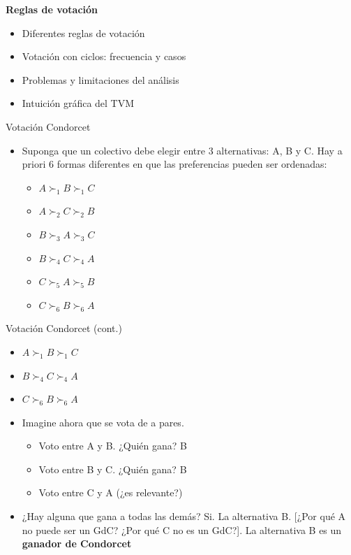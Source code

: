 \documentclass[
  ignorenonframetext,
]{beamer}
\providecommand{\tightlist}{%
  \setlength{\itemsep}{0pt}\setlength{\parskip}{0pt}}\usepackage{longtable,booktabs,array}
\begin{document}
\begin{frame}{\textbf{Reglas de votación}}
\protect\hypertarget{reglas-de-votaciuxf3n}{}
\begin{itemize}
\tightlist
\item
  Diferentes reglas de votación
\item
  Votación con ciclos: frecuencia y casos
\item
  Problemas y limitaciones del análisis
\item
  Intuición gráfica del TVM
\end{itemize}

\begin{block}{Votación Condorcet}
\protect\hypertarget{votaciuxf3n-condorcet}{}
\begin{itemize}
\tightlist
\item
  Suponga que un colectivo debe elegir entre 3 alternativas: A, B y C.
  Hay a priori 6 formas diferentes en que las preferencias pueden ser
  ordenadas:

  \begin{itemize}
  \tightlist
  \item
    \(A \succ_{1} B \succ_{1} C\)
  \item
    \(A \succ_{2} C \succ_{2} B\)
  \item
    \(B \succ_{3} A \succ_{3} C\)
  \item
    \(B \succ_{4} C \succ_{4} A\)
  \item
    \(C \succ_{5} A \succ_{5} B\)
  \item
    \(C \succ_{6} B \succ_{6} A\)
  \end{itemize}
\end{itemize}
\end{block}

\begin{block}{Votación Condorcet (cont.)}
\protect\hypertarget{votaciuxf3n-condorcet-cont.}{}
\begin{itemize}
\item
  \(A \succ_{1} B \succ_{1} C\)
\item
  \(B \succ_{4} C \succ_{4} A\)
\item
  \(C \succ_{6} B \succ_{6} A\)
\item
  Imagine ahora que se vota de a pares.

  \begin{itemize}
  \tightlist
  \item
    Voto entre A y B. ¿Quién gana? B
  \item
    Voto entre B y C. ¿Quién gana? B
  \item
    Voto entre C y A (¿es relevante?)
  \end{itemize}
\item
  ¿Hay alguna que gana a todas las demás? Si. La alternativa B. {[}¿Por
  qué A no puede ser un GdC? ¿Por qué C no es un GdC?{]}. La alternativa
  B es un \textbf{ganador de Condorcet}
\end{itemize}
\end{block}


\end{frame}
\end{document}
